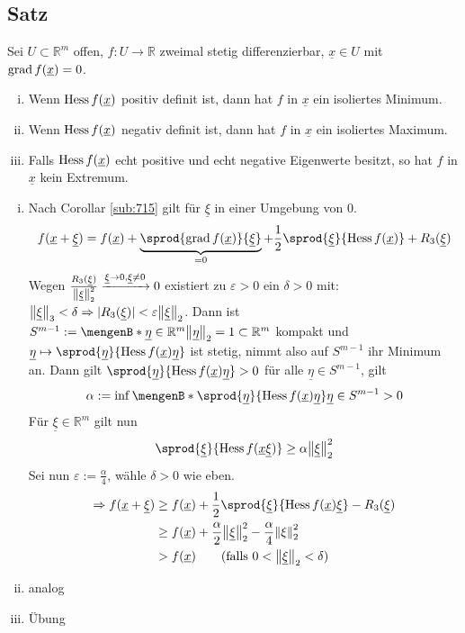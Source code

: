 \subsection[Satz über ein hinreichendes Kriterium für Extrema]{Satz} %
\label{sub:719}
Sei $U \subset \mathds{R}^m$ offen, $f : U \to \mathds{R}$ zweimal stetig differenzierbar, $\underline{x} \in U$ mit $\operatorname{grad} f(\underline{x}) =0$. 
\begin{enumerate}[(i)]
	\item Wenn $\operatorname{Hess} f(\underline{x})$ positiv definit ist, dann hat $f$ in $\underline{x}$ ein isoliertes Minimum.
	\item Wenn $\operatorname{Hess} f(\underline{x})$ negativ definit ist, dann hat $f$ in $\underline{x}$ ein isoliertes Maximum.
	\item Falls $\operatorname{Hess} f(\underline{x})$ echt positive und echt negative Eigenwerte besitzt, so hat $f$ in $\underline{x}$ kein Extremum.
\end{enumerate}
\begin{enumerate}[(i)]
	\item Nach Corollar \ref{sub:715} gilt für $\underline{\xi}$ in einer Umgebung von $0$.
	\begin{align*}
		f(\underline{x} + \underline{\xi}) = f(\underline{x}) + \underbrace{\sprod{\grad f(\underline{x})}{\underline{\xi}}}_{=0} + 
		\frac{1}{2} \sprod{\underline{\xi}}{ \hess f(\underline{x})} + R_3 (\underline{\xi})  
	\end{align*}
	Wegen $\frac{R_3 (\underline{\xi})}{\norm[2]{\underline{\xi}}^2 } \xrightarrow{\underline{\xi} \to 0, \underline{\xi} \not= 0}  0$ existiert zu $\varepsilon >0$ ein 
	$\delta >0$ mit: $\norm[3]{\underline{\xi}} < \delta   \Rightarrow  \abs{R_3( \underline{\xi})} < \varepsilon \norm[2]{\underline{\xi}} $. Dann ist
	$S^{m-1} := \set[\underline{\eta} \in \mathds{R}^m]{\norm[2]{\underline{\eta}} =1 } \subset \mathds{R}^m$ kompakt und 
	$\underline{\eta} \mapsto \sprod{\underline{\eta}}{ \hess f (\underline{x}) \underline{\eta}} $ ist stetig, nimmt also auf $S^{m-1}$ ihr Minimum an. Dann gilt
	$\sprod{\underline{\eta}}{ \hess f(\underline{x}) \underline{\eta}} >0$ für alle $\underline{\eta} \in S^{m-1}$, gilt 
	\[
		\alpha := \inf \set[\sprod{\underline{\eta}}{\hess f(\underline{x}) \underline{\eta}} ]{\underline{\eta} \in S^{m-1}} >0 
	\]
	Für $\underline{\xi} \in \mathds{R}^m$ gilt nun
	\[
		\sprod{\underline{\xi}}{\hess f(\underline{x} \underline{\xi})} \ge \alpha \norm[2]{\underline{\xi}}^2  
	\]
	Sei nun $\varepsilon := \frac{\alpha}{4}$, wähle $\delta >0$ wie eben. 
	\begin{align*}
		\Rightarrow  f(\underline{x} + \underline{\xi}) &\ge f(\underline{x}) + \frac{1}{2} \sprod{\underline{\xi}}{\hess f(\underline{x}) \underline{\xi}}  - R_3 
		(\underline{\xi}) \\
		&\ge f(\underline{x}) + \frac{\alpha}{2} \norm[2]{\underline{\xi}}^2 - \frac{\alpha}{4} \norm[2]{\xi}^2 \\
		&> f(\underline{x}) \tag{falls $0< \norm[2]{\underline{\xi}}< \delta  $}
	\end{align*}
	\item analog
	\item Übung
\end{enumerate} \bewende
